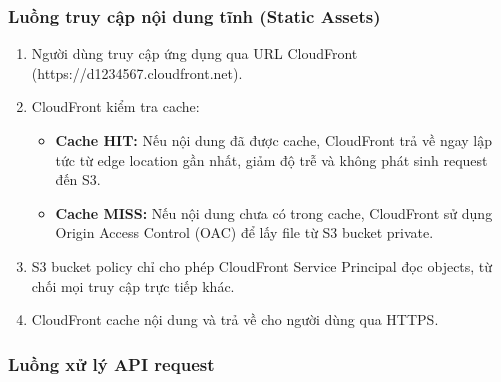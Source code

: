 \subsubsection{Luồng truy cập nội dung tĩnh (Static Assets)}

\begin{enumerate}
    \item Người dùng truy cập ứng dụng qua URL CloudFront (https://d1234567.cloudfront.net).
    \item CloudFront kiểm tra cache:
    \begin{itemize}
        \item \textbf{Cache HIT:} Nếu nội dung đã được cache, CloudFront trả về ngay lập tức từ edge location gần nhất, giảm độ trễ và không phát sinh request đến S3.
        \item \textbf{Cache MISS:} Nếu nội dung chưa có trong cache, CloudFront sử dụng Origin Access Control (OAC) để lấy file từ S3 bucket private.
    \end{itemize}
    \item S3 bucket policy chỉ cho phép CloudFront Service Principal đọc objects, từ chối mọi truy cập trực tiếp khác.
    \item CloudFront cache nội dung và trả về cho người dùng qua HTTPS.
\end{enumerate}

\subsubsection{Luồng xử lý API request}


